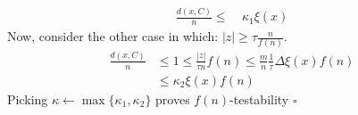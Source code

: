\documentclass[sigplan,screen]{acmart}
\begin{document}
\begin{multicols*}{2}
\begin{equation*}
\begin{split}
      \frac{d\left( x, C \right)}{n} \le & \  \kappa_{1} \xi\left( x \right)    
    \end{split}
  \end{equation*}
  Now, consider the other case in which: $ |z| \ge \tau \frac{n}{f\left( n \right)}  $.
  \begin{equation*}
    \begin{split}
      \frac{d\left( x, C \right)}{n} & \le 1 \le \frac{|z|}{\tau n}f\left( n \right) \le \frac{m}{n} \frac{1}{\tau} \Delta \xi\left( x\right)f\left( n \right) \\ & \le \kappa_{2} \xi\left( x \right)f\left( n \right)  
    \end{split}
  \end{equation*}
  Picking $ \kappa \leftarrow \max \{ \kappa_{1}, \kappa_{2} \}$ proves $f\left( n \right)$-testability $\square$
\end{multicols*}
\printbibliography 
\end{document}
